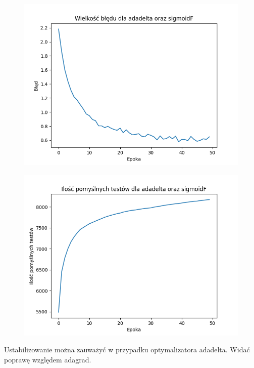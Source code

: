 \documentclass{article}
\begin{document}
\begin{figure}[!htb]
  \centering
  \includegraphics[width=\linewidth]{error_adadelta_sigmoidF.png}
\end{figure}

\begin{figure}[!htb]
  \centering
  \includegraphics[width=\linewidth]{test_adadelta_sigmoidF.png}
\end{figure}

Ustabilizowanie można zauważyć w przypadku optymalizatora adadelta. Widać poprawę względem adagrad.
\end{document}
